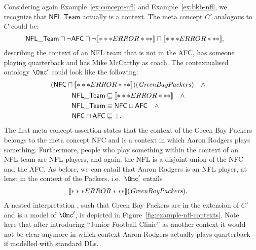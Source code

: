 \begin{example}\label{ex:nfl-with-contexts}
  Considering again Example~\ref{ex:concept-nfl} and Example~\ref{ex:bkb-nfl}, we recognize that
  $\mathsf{NFL\_Team}$ actually is a context. The meta concept $C'$ analogous to $C$ could be:
  \begin{align*}
    & \mathsf{NFL\_{}Team} \sqcap \lnot \mathsf{AFC} \sqcap
    \lnot\oax{\exists\plays.\mathsf{Quarterback}\sqsubseteq\bot} 
    \sqcap \oax{\mathsf{Coach}(\text{\textit{MikeMcCarthy}})},
  \end{align*}
  describing the context of an NFL team that is not in the AFC, has someone playing quarterback and
  has Mike McCarthy as coach.  The contextualised ontology $\Omc'$ could look like the following:
  \begin{gather*}
    (\mathsf{NFC} \sqcap
    \oax{(\exists\plays.\top)(\text{\textit{AaronRodgers}})})(\text{\textit{GreenBayPackers}})
    \quad\land\\ 
    \begin{aligned}
      \mathsf{NFL\_Team} & \sqsubseteq \oax{\exists\plays.\top \sqsubseteq
        \mathsf{NFL\_Player}}\quad\land\\ 
      \mathsf{NFL\_Team} & \equiv \mathsf{NFC} \sqcup \mathsf{AFC}\quad\land\\
      \mathsf{NFC} \sqcap \mathsf{AFC} & \sqsubseteq \bot.
    \end{aligned}
  \end{gather*}
  The first meta concept assertion states that the context of the Green Bay Packers belongs to the
  meta concept NFC and is a context in which Aaron Rodgers plays something. Furthermore, people who
  play something within the context of an NFL team are NFL players, and again, the NFL is a disjoint
  union of the NFC and the AFC. As before, we can entail that Aaron Rodgers is an NFL player, at
  least in the context of the Packers, i.e.\ $\Omc'$ entails
  \begin{gather*}
    \oax{\mathsf{NFL\_Player}(\text{\textit{AaronRodgers}})}(\text{\textit{GreenBayPackers}}).
  \end{gather*}
  A nested interpretation \J, such that Green Bay Packers are in the extension of $C'$ and \J is a
  model of $\Omc'$, is depicted in Figure~\ref{fig:example-nfl-contexts}. Note here that after
  introducing ``Junior Football Clinic'' as another context it would not be clear anymore in which
  context Aaron Rodgers actually plays quarterback if modelled with standard DLs.
\end{example}

